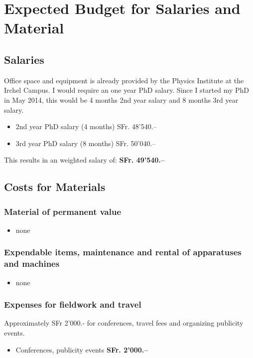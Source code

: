 \documentclass[12pt]{article}
\begin{document}
\pagestyle{empty}

\newpage

\section*{Expected Budget for Salaries and Material}

\subsection{Salaries}
Office space and equipment is already provided by the Physics Institute at the Irchel Campus.
I would require an one year PhD salary. Since I started my PhD in May 2014, this would be 4 months 2nd year salary and 8 months 3rd year salary.

\begin{itemize}
	\item 2nd year PhD salary (4 months) \hfill SFr. 48'540.--
	\item 3rd year PhD salary (8 months) \hfill SFr. 50'040.--
\end{itemize}

This results in an weighted salary of: \hfill {\bf SFr. 49'540.--}


\subsection{Costs for Materials}

\subsubsection{Material of permanent value}

\begin{itemize}
	\item none
\end{itemize}


\subsubsection{Expendable items, maintenance and rental of apparatuses and machines}

\begin{itemize}
	\item none
\end{itemize}


\subsubsection{Expenses for fieldwork and travel}
Approximately SFr 2'000.- for conferences, travel fees and organizing publicity events.
\begin{itemize}
	\item Conferences, publicity events \hfill {\bf SFr. 2'000.--}
\end{itemize}
\end{document}
